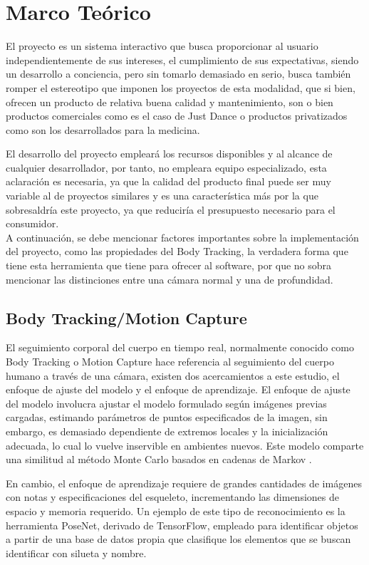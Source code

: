 \chapter{Marco Teórico}


El proyecto es un sistema interactivo que busca proporcionar al usuario independientemente de sus intereses, el cumplimiento de sus expectativas, siendo un desarrollo a conciencia, pero sin tomarlo demasiado en serio, busca también romper el estereotipo que imponen los proyectos de esta modalidad, que si bien, ofrecen un producto de relativa buena calidad y mantenimiento, son o bien productos comerciales como es el caso de Just Dance o productos privatizados como son los desarrollados para la medicina. 

El desarrollo del proyecto empleará los recursos disponibles y al alcance de cualquier desarrollador, por tanto, no empleara equipo especializado, esta aclaración es necesaria, ya que la calidad del producto final puede ser muy variable al de proyectos similares y es una característica más por la que sobresaldría este proyecto, ya que reduciría el presupuesto necesario para el consumidor.\\

A continuación, se debe mencionar factores importantes sobre la implementación del proyecto, como las propiedades del Body Tracking, la verdadera forma que tiene esta herramienta que tiene para ofrecer al software, por que no sobra mencionar las distinciones entre una cámara normal y una de profundidad.


\section{Body Tracking/Motion Capture}

El seguimiento corporal del cuerpo en tiempo real, normalmente conocido como Body Tracking o Motion Capture hace referencia al seguimiento del cuerpo humano a través de una cámara, existen dos acercamientos a este estudio, el enfoque de ajuste del modelo y el enfoque de aprendizaje. El enfoque de ajuste del modelo involucra ajustar el modelo formulado según imágenes previas cargadas, estimando parámetros de puntos especificados de la imagen, sin embargo, es demasiado dependiente de extremos locales y la inicialización adecuada, lo cual lo vuelve inservible en ambientes nuevos. Este modelo comparte una similitud al método Monte Carlo basados en cadenas de Markov \cite{siddiqui2010human}.

En cambio, el enfoque de aprendizaje requiere de grandes cantidades de imágenes con notas y especificaciones del esqueleto, incrementando las dimensiones de espacio y memoria requerido. Un ejemplo de este tipo de reconocimiento es la herramienta PoseNet, derivado de TensorFlow, empleado para identificar objetos a partir de una base de datos propia que clasifique los elementos que se buscan identificar con silueta y nombre.

